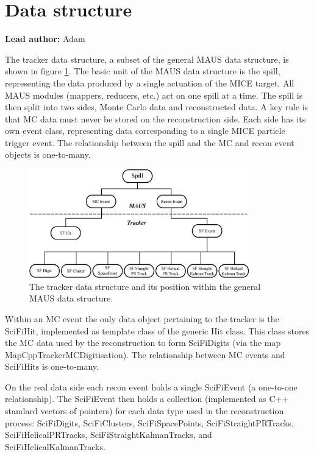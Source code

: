 \section{Data structure}
\label{Sect:DataStructure}

{\bf Lead author:} Adam

The tracker data structure, a subset of the general MAUS data structure, is shown in figure \ref{Fig:DataStructure}.  The basic unit of the MAUS data structure is the spill, representing the data produced by a single actuation of the MICE target.  All MAUS modules (mappers, reducers, etc.) act on one spill at a time.  The spill is then split into two sides, Monte Carlo data and reconstructed data.  A key rule is that MC data must never be stored on the reconstruction side. Each side has its own event class, representing data corresponding to a single MICE particle trigger event.  The relationship between the spill and the MC and recon event objects is one-to-many. 

\begin{figure}[htb]
    \includegraphics[width=0.85\textwidth]
      {05-DataStructure/Figures/DataStructure.eps}
    \caption{The tracker data structure and its position within the general MAUS data structure.}
    \label{Fig:DataStructure}
\end{figure}

Within an MC event the only data object pertaining to the tracker is the SciFiHit, implemented as template class of the generic Hit class.  This class stores the MC data used by the reconstruction to form SciFiDigits (via the map MapCppTrackerMCDigitisation).  The relationship between MC events and SciFiHits is one-to-many.

On the real data side each recon event holds a single SciFiEvent (a one-to-one relationship). The SciFiEvent then holds a collection (implemented as C++ standard vectors of pointers) for each data type used in the reconstruction process: SciFiDigits, SciFiClusters, SciFiSpacePoints, SciFiStraightPRTracks, SciFiHelicalPRTracks, SciFiStraightKalmanTracks, and  SciFiHelicalKalmanTracks.


